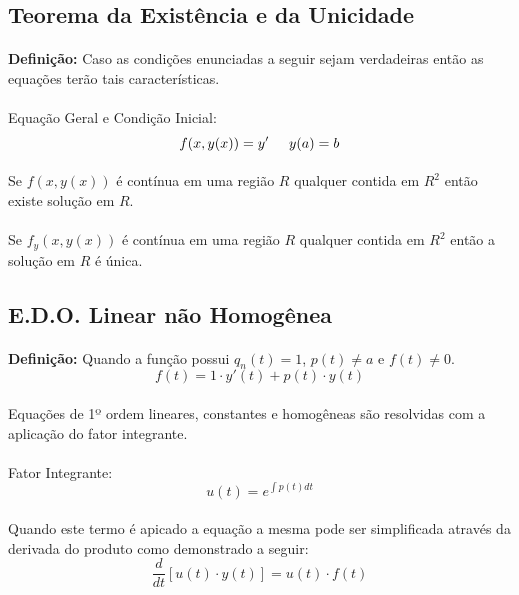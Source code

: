 \documentclass{article}
\begin{document}
\begin{enumerate}[rightmargin = \leftmargin]
    \subsection{Teorema da Existência e da Unicidade}
        \paragraph{}\textbf{Definição:} Caso as condições enunciadas a seguir sejam verdadeiras então as equações terão tais características.
        \paragraph{}Equação Geral e Condição Inicial:
            \[f(x,y(x)) = y' \hspace{5mm} y(a) = b\]
        \paragraph{}Se $f(x,y(x))$ é contínua em uma região $R$ qualquer contida em $R^2$ então existe solução em $R$.
        \paragraph{}Se $f_y(x,y(x))$ é contínua em uma região $R$ qualquer contida em $R^2$ então a solução em $R$ é única.
    
    \subsection{E.D.O. Linear não Homogênea}
        \paragraph{}\textbf{Definição:} Quando a função possui $q_{n}(t) = 1$, $p(t) \neq a$ e $f(t) \neq 0$.
            \[f(t) = 1 \cdot y'(t) + p(t) \cdot y(t)\]
        
        \paragraph{}Equações de 1º ordem lineares, constantes e homogêneas são resolvidas com a aplicação do fator integrante.
        \paragraph{}Fator Integrante:
            \[u(t) = e^{\int{p(t)dt}}\]
        \paragraph{}Quando este termo é apicado a equação a mesma pode ser simplificada através da derivada do produto como demonstrado a seguir:
            \[\frac{d}{dt}[u(t) \cdot y(t)] = u(t) \cdot f(t)\]

\end{enumerate}
\end{document}
